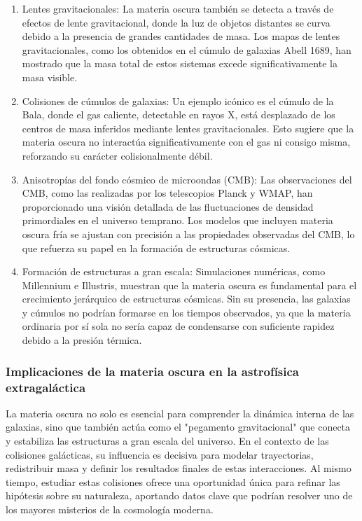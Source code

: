 \documentclass{article}
\begin{document}
\begin{enumerate}
    \item Lentes gravitacionales: La materia oscura también se detecta a través de efectos de lente gravitacional, donde la luz de objetos distantes se curva debido a la presencia de grandes cantidades de masa. Los mapas de lentes gravitacionales, como los obtenidos en el cúmulo de galaxias Abell 1689, han mostrado que la masa total de estos sistemas excede significativamente la masa visible.
    \item Colisiones de cúmulos de galaxias: Un ejemplo icónico es el cúmulo de la Bala, donde el gas caliente, detectable en rayos X, está desplazado de los centros de masa inferidos mediante lentes gravitacionales. Esto sugiere que la materia oscura no interactúa significativamente con el gas ni consigo misma, reforzando su carácter colisionalmente débil.
    \item Anisotropías del fondo cósmico de microondas (CMB): Las observaciones del CMB, como las realizadas por los telescopios Planck y WMAP, han proporcionado una visión detallada de las fluctuaciones de densidad primordiales en el universo temprano. Los modelos que incluyen materia oscura fría se ajustan con precisión a las propiedades observadas del CMB, lo que refuerza su papel en la formación de estructuras cósmicas.
    \item Formación de estructuras a gran escala: Simulaciones numéricas, como Millennium e Illustris, muestran que la materia oscura es fundamental para el crecimiento jerárquico de estructuras cósmicas. Sin su presencia, las galaxias y cúmulos no podrían formarse en los tiempos observados, ya que la materia ordinaria por sí sola no sería capaz de condensarse con suficiente rapidez debido a la presión térmica.
\end{enumerate}

\subsubsection{Implicaciones de la materia oscura en la astrofísica extragaláctica}
La materia oscura no solo es esencial para comprender la dinámica interna de las galaxias, sino que también actúa como el "pegamento gravitacional" que conecta y estabiliza las estructuras a gran escala del universo. En el contexto de las colisiones galácticas, su influencia es decisiva para modelar trayectorias, redistribuir masa y definir los resultados finales de estas interacciones. Al mismo tiempo, estudiar estas colisiones ofrece una oportunidad única para refinar las hipótesis sobre su naturaleza, aportando datos clave que podrían resolver uno de los mayores misterios de la cosmología moderna.
\end{document}
